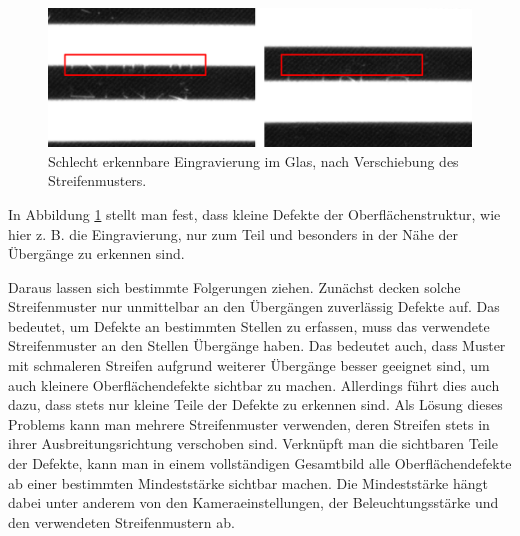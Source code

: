 \begin{figure}[H]
	\centering
	\includegraphics[width=\textwidth]{03_sichtpruefungDurchLichtstreuung/verfahren/figures/minorScratch}
	\caption[Eingravierung im Glas]{Schlecht erkennbare Eingravierung im Glas, nach Verschiebung des Streifenmusters.}
	\label{img:engraving}
\end{figure}

\noindent
In Abbildung \ref{img:engraving} stellt man fest, dass kleine Defekte der Oberflächenstruktur, wie hier z. B. die Eingravierung, nur zum Teil und besonders in der Nähe der Übergänge zu erkennen sind.

\p
Daraus lassen sich bestimmte Folgerungen ziehen.
Zunächst decken solche Streifenmuster nur unmittelbar an den Übergängen zuverlässig Defekte auf.
Das bedeutet, um Defekte an bestimmten Stellen zu erfassen, muss das verwendete Streifenmuster an den Stellen Übergänge haben.
Das bedeutet auch, dass Muster mit schmaleren Streifen aufgrund weiterer Übergänge besser geeignet sind, um auch kleinere Oberflächendefekte sichtbar zu machen.
Allerdings führt dies auch dazu, dass stets nur kleine Teile der Defekte zu erkennen sind.
Als Lösung dieses Problems kann man mehrere Streifenmuster verwenden, deren Streifen stets in ihrer Ausbreitungsrichtung verschoben sind.
Verknüpft man die sichtbaren Teile der Defekte, kann man in einem vollständigen Gesamtbild alle Oberflächendefekte ab einer bestimmten Mindeststärke sichtbar machen.
Die Mindeststärke hängt dabei unter anderem von den Kameraeinstellungen, der Beleuchtungsstärke und den verwendeten Streifenmustern ab.
